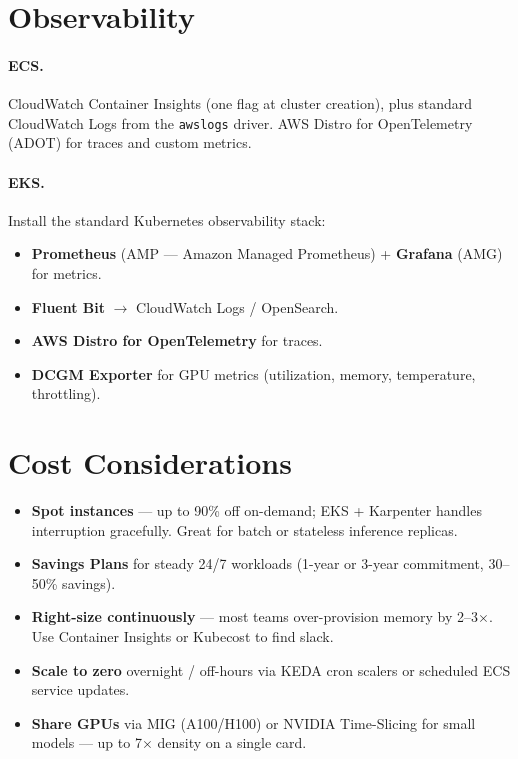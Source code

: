 \documentclass[11pt,a4paper]{article}
\begin{document}
\section{Observability}

\paragraph{ECS.} CloudWatch Container Insights (one flag at cluster creation),
plus standard CloudWatch Logs from the \texttt{awslogs} driver. AWS
Distro for OpenTelemetry (ADOT) for traces and custom metrics.

\paragraph{EKS.} Install the standard Kubernetes observability stack:
\begin{itemize}[leftmargin=*,nosep]
    \item \textbf{Prometheus} (AMP --- Amazon Managed Prometheus) + \textbf{Grafana}
          (AMG) for metrics.
    \item \textbf{Fluent Bit} $\rightarrow$ CloudWatch Logs / OpenSearch.
    \item \textbf{AWS Distro for OpenTelemetry} for traces.
    \item \textbf{DCGM Exporter} for GPU metrics (utilization, memory,
          temperature, throttling).
\end{itemize}

\section{Cost Considerations}

\begin{itemize}[leftmargin=*]
    \item \textbf{Spot instances} --- up to 90\% off on-demand; EKS + Karpenter
          handles interruption gracefully. Great for batch or stateless
          inference replicas.
    \item \textbf{Savings Plans} for steady 24/7 workloads (1-year or 3-year
          commitment, 30--50\% savings).
    \item \textbf{Right-size continuously} --- most teams over-provision memory
          by 2--3$\times$. Use Container Insights or Kubecost to find slack.
    \item \textbf{Scale to zero} overnight / off-hours via KEDA cron scalers or
          scheduled ECS service updates.
    \item \textbf{Share GPUs} via MIG (A100/H100) or NVIDIA Time-Slicing for
          small models --- up to 7$\times$ density on a single card.
\end{itemize}
\end{document}
